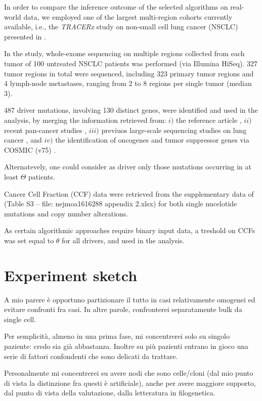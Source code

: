 \documentclass{article}
\begin{document}
In order to compare the inference outcome of the selected algorithms on real-world data, we employed one of the largest multi-region cohorts currently available, i.e., the \emph{TRACERx} study on non-small cell lung cancer (NSCLC) presented in \cite{jamal2017tracking}. 

In the study, whole-exome sequencing on multiple regions collected from each tumor of 100 untreated NSCLC patients was performed (via Illumina HiSeq). 
327 tumor regions in total were sequenced, including 323 primary tumor regions and 4 lymph-node metastases, ranging from 2 to 8 regions per single tumor (median 3).

487  driver mutations, involving 130 distinct genes, were identified and used in the analysis, by merging the information retrieved from: $i)$ the reference article \cite{jamal2017tracking}, $ii)$ recent pan-cancer studies \cite{lawrence2014discovery}, $iii)$ previuos large-scale sequencing studies on lung cancer \cite{cancer2012comprehensive,cancer2014comprehensive}, and $iv)$ the identification of oncogenes and tumor suppressor genes  via COSMIC (v75) \cite{forbes2016cosmic}.

Alternatevely, one could consider as driver only those mutations occurring in at least $\Theta$ patients. 

Cancer Cell Fraction (CCF) data were retrieved from the supplementary data of \cite{jamal2017tracking} (Table S3 -- file: nejmoa1616288 appendix 2.xlsx) for both single nucelotide mutations and copy number alterations.

As certain algorithmic approaches require binary input data, a treshold on CCFs was set equal to $\theta$ for all drivers, and used in the analysis. 


\section{Experiment sketch}

A mio parere è opportuno partizionare il tutto in casi relativamente
omogenei ed evitare confronti fra casi. In altre parole, confronterei
separatamente bulk da single cell.

Per semplicità, almeno in una prima fase, mi concentrerei solo su
singolo paziente: credo sia già abbastanza. Inoltre su più pazienti
entrano in gioco una serie di fattori confondenti che sono delicati da
trattare.

Personalmente mi concentrerei su avere nodi che sono celle/cloni (dal
mio punto di vista la distinzione fra questi è artificiale), anche per
avere maggiore supporto, dal punto di vista della valutazione, dalla
letteratura in filogenetica.


\end{document}
